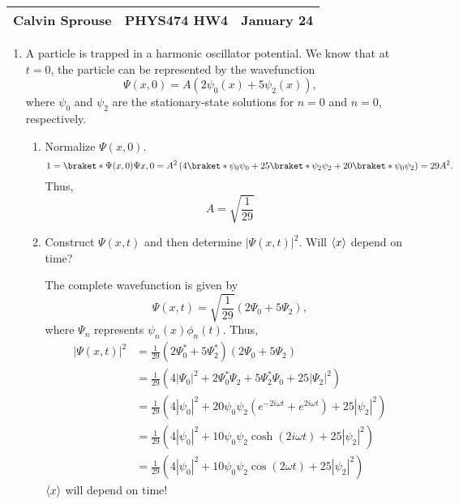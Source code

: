 \documentclass[a4paper, 12pt]{config/homework}
\begin{document}
\noindent
\begin{tabularx}{\textwidth}{>{\centering\arraybackslash}X>{\centering\arraybackslash}X>{\centering\arraybackslash}X}
Calvin Sprouse & PHYS474 HW4 & 2024 January 24\\
\midrule
\end{tabularx}

\begin{enumerate}
\item A particle is trapped in a harmonic oscillator potential. We know that at \(t=0\), the particle can be represented by the wavefunction
\[\Psi(x,0) = A\left(2\psi_0(x) + 5\psi_2(x)\right),\]
where \(\psi_0\) and \(\psi_2\) are the stationary-state solutions for \(n=0\) and \(n=0\), respectively.
\begin{enumerate}[label=(\alph*)]
\item Normalize \(\Psi(x,0)\).
\[1 = \braket*{\Psi(x,0)}{\Psi{x,0}}
= A^2 \left( 4 \braket*{\psi_0}{\psi_0} + 25 \braket*{\psi_2}{\psi_2} + 20\braket*{\psi_0}{\psi_2} \right)
= 29 A^2.\]
Thus,
\[A = \sqrt{\frac{1}{29}}\]

\item Construct \(\Psi(x,t)\) and then determine \(\left|\Psi(x,t)\right|^2\). Will \(\left\langle x \right\rangle\) depend on time?

The complete wavefunction is given by
\[\Psi(x,t) = \sqrt{\frac{1}{29}} \left( 2 \Psi_0 + 5 \Psi_2 \right),\]
where \(\Psi_n\) represents \(\psi_n(x)\phi_n(t)\). Thus,
\begin{align*}
\left| \Psi(x,t) \right|^2 &= \frac{1}{29}\left(2\Psi_0^* + 5\Psi_2^*\right)\left(2\Psi_0 + 5\Psi_2\right)
\\&= \frac{1}{29}\left(4\left|\Psi_0\right|^2 + 2\Psi_0^*\Psi_2 + 5\Psi_2^*\Psi_0 + 25\left|\Psi_2\right|^2\right)
\\&= \frac{1}{29}\left(4\left|\psi_0\right|^2
+ 20\psi_0\psi_2\left(e^{-2i\omega t} + e^{2i\omega t}\right)
+ 25\left|\psi_2\right|^2\right)
\\&= \frac{1}{29}\left(
4\left|\psi_0\right|^2
+ 10 \psi_0 \psi_2 \cosh(2i\omega t)
+ 25 \left|\psi_2\right|^2
\right)
\\&= \frac{1}{29}\left(
4\left|\psi_0\right|^2
+ 10 \psi_0 \psi_2 \cos(2\omega t)
+ 25 \left|\psi_2\right|^2
\right)
\end{align*}
\(\left\langle x \right\rangle\) will depend on time!
\end{enumerate}


\end{enumerate}
\end{document}
